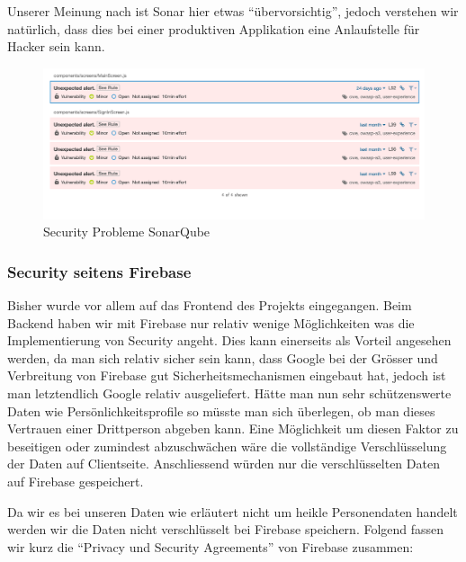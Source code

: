 Unserer Meinung nach ist Sonar hier etwas ``übervorsichtig'', jedoch verstehen wir natürlich, dass dies bei einer produktiven Applikation eine Anlaufstelle für Hacker sein kann.

\begin{figure}[H]
    \centering
    \includegraphics[width=\textwidth]{images/sonar_details.png}
    \caption{Security Probleme SonarQube}
    \label{fig:sonar_security}
\end{figure}

\subsubsection{Security seitens Firebase}
Bisher wurde vor allem auf das Frontend des Projekts eingegangen. Beim Backend haben wir mit Firebase nur relativ wenige Möglichkeiten was die Implementierung von Security angeht. Dies kann einerseits als Vorteil angesehen werden, da man sich relativ sicher sein kann, dass Google bei der Grösser und Verbreitung von Firebase gut Sicherheitsmechanismen eingebaut hat, jedoch ist man letztendlich Google relativ ausgeliefert. Hätte man nun sehr schützenswerte Daten wie Persönlichkeitsprofile so müsste man sich überlegen, ob man dieses Vertrauen einer Drittperson abgeben kann. Eine Möglichkeit um diesen Faktor zu beseitigen oder zumindest abzuschwächen wäre die vollständige Verschlüsselung der Daten auf Clientseite. Anschliessend würden nur die verschlüsselten Daten auf Firebase gespeichert.

Da wir es bei unseren Daten wie erläutert nicht um heikle Personendaten handelt werden wir die Daten nicht verschlüsselt bei Firebase speichern. Folgend fassen wir kurz die ``Privacy und Security Agreements'' von Firebase zusammen:

